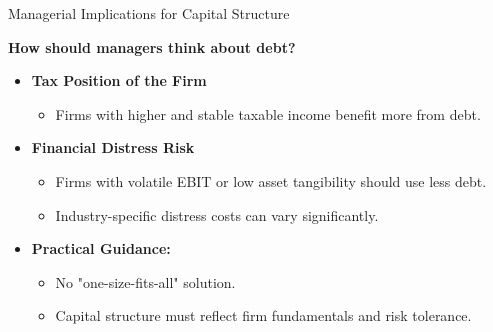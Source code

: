 \begin{frame}{Managerial Implications for Capital Structure}
	
	\textbf{How should managers think about debt?}
	
	\begin{itemize}
		\item \textbf{Tax Position of the Firm}
		\begin{itemize}
			\item Firms with higher and stable taxable income benefit more from debt.
		\end{itemize}
		
		\item \textbf{Financial Distress Risk}
		\begin{itemize}
			\item Firms with volatile EBIT or low asset tangibility should use less debt.
			\item Industry-specific distress costs can vary significantly.
		\end{itemize}
		
		\item \textbf{Practical Guidance:}
		\begin{itemize}
			\item No "one-size-fits-all" solution.
			\item Capital structure must reflect firm fundamentals and risk tolerance.
		\end{itemize}
	\end{itemize}
	
\end{frame}

